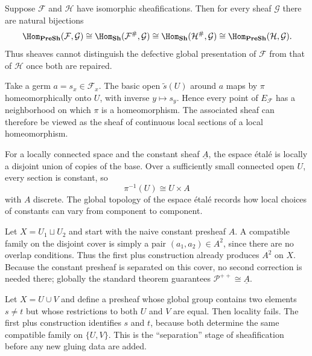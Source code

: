 \begin{example}
Suppose $\mathcal F$ and $\mathcal H$ have isomorphic sheafifications.  Then for every sheaf
$\mathcal G$ there are natural bijections
\[
\Hom_{\PreSh}(\mathcal F,\mathcal G)
\cong
\Hom_{\Sh}(\mathcal F^\#,\mathcal G)
\cong
\Hom_{\Sh}(\mathcal H^\#,\mathcal G)
\cong
\Hom_{\PreSh}(\mathcal H,\mathcal G).
\]
Thus sheaves cannot distinguish the defective global presentation of $\mathcal F$ from that
of $\mathcal H$ once both are repaired.
\end{example}

\begin{example}
Take a germ $a=s_x\in\mathcal F_x$.  The basic open $\widetilde s(U)$ around $a$ maps by
$\pi$ homeomorphically onto $U$, with inverse $y\mapsto s_y$.  Hence every point of
$E_{\mathcal F}$ has a neighborhood on which $\pi$ is a homeomorphism.  The associated
sheaf can therefore be viewed as the sheaf of continuous local sections of a local
homeomorphism.
\end{example}

\begin{example}
For a locally connected space and the constant sheaf $\underline A$, the espace
\'{e}tal\'{e} is locally a disjoint union of copies of the base.  Over a sufficiently small
connected open $U$, every section is constant, so
\[
\pi^{-1}(U)\cong U\times A
\]
with $A$ discrete.  The global topology of the espace \'{e}tal\'{e} records how local choices
of constants can vary from component to component.
\end{example}

\begin{example}
Let $X=U_1\sqcup U_2$ and start with the naive constant presheaf $A$.  A compatible family
on the disjoint cover is simply a pair $(a_1,a_2)\in A^2$, since there are no overlap
conditions.  Thus the first plus construction already produces $A^2$ on $X$.  Because the
constant presheaf is separated on this cover, no second correction is needed there; globally
the standard theorem guarantees $\mathcal P^{++}\cong\underline A$.
\end{example}

\begin{example}
Let $X=U\cup V$ and define a presheaf whose global group contains two elements $s\neq t$ but
whose restrictions to both $U$ and $V$ are equal.  Then locality fails.  The first plus
construction identifies $s$ and $t$, because both determine the same compatible family on
$\{U,V\}$.  This is the ``separation'' stage of sheafification before any new gluing data are
added.
\end{example}

